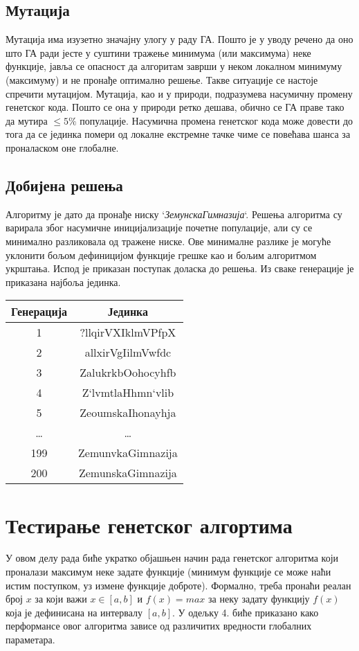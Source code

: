 \documentclass{article}
\begin{document}
\subsection{Мутација}
Мутација има изузетно значајну улогу у раду ГА. Пошто је у уводу речено
да оно што ГА ради јесте у суштини тражење минимума (или максимума) неке функције, јавља се 
опасност да алгоритам заврши у неком локалном минимуму (максимуму) и не пронађе 
оптимално решење. Такве ситуације се настоје спречити мутацијом. Мутација, као и у природи,
подразумева насумичну промену генетског кода. Пошто се она у природи ретко дешава, обично
се ГА праве тако да мутира $\leq 5 \%$ популације. Насумична промена генетског кода 
може довести до тога да се јединка помери од локалне екстремне тачке чиме се повећава 
шанса за проналаском оне глобалне.

\subsection{Добијена решења}
Алгоритму је дато да пронађе ниску `\textit{ЗемунскаГимназија}`. Решења алгоритма су варирала
због насумичне иницијализације почетне популације, али су се минимално разликовала од тражене ниске.
Ове минималне разлике је могуће уклонити бољом дефиницијом функције грешке као и бољим алгоритмом укрштања.
Испод је приказан поступак доласка до решења. Из сваке генерације је приказана најбоља јединка.

\begin{table}[H]
    \centering
    \begin{tabular}{|c|c|}
        \textbf{Генерација} & \textbf{Јединка} \\ 
        \hline
        1 & ?llqirVXIklmVPfpX  \\
        2 & allxirVgIilmVwfdc  \\
        3 & ZalukrkbOohocyhfb  \\
        4 & Z`lvmtlaHhmn`vlib  \\
        5 & ZeoumskaIhonayhja  \\
        \dots & \dots \\
        199 & ZemunvkaGimnazija \\
        200 & ZemunskaGimnazija \\
    \end{tabular}
\end{table}

\newpage

\section{Тестирање генетског алгортима}
У овом делу рада биће укратко објашњен начин рада генетског алгоритма који проналази
максимум неке задате функције (минимум функције се може наћи истим поступком, уз 
измене функције доброте). Формално, треба пронаћи реалан број $x$ за који важи $x \in [a, b]$ и 
$f(x) = max$ за неку задату функцију $f(x)$ која је дефинисана на интервалу $[a, b]$. 
У одељку 4. биће приказано како перформансе овог алгоритма зависе од различитих 
вредности глобалних параметара.
\end{document}

